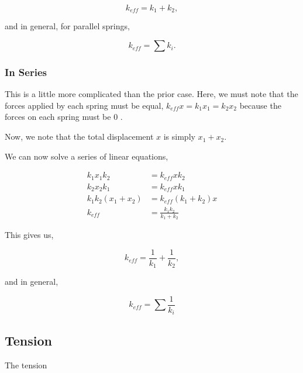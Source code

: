 \begin{equation*}
    \boxed{k_{eff} = k_1 + k_2},
\end{equation*}

and in general, for parallel springs, 

\begin{equation}
    \boxed{k_{eff} = \sum k_i.}
\end{equation}

\subsubsection{In Series}

This is a little more complicated than the prior case. Here, 
we must note that the forces applied by each spring must be equal, 
\(k_{eff}x = k_1x_1 = k_2x_2\) because 
the forces on each spring must be \(0\) .

Now, we note that the total displacement \(x\) is simply \(x_1 + x_2\). 

We can now solve a series of linear equations,

\begin{align*}
    k_1x_1k_2 &= k_{eff} xk_2 \\
    k_2x_2k_1 &= k_{eff} xk_1 \\
    k_1k_2(x_1 + x_2) &= k_{eff}(k_1 + k_2) x\\
    k_{eff} &= \frac{k_1k_2}{k_1 + k_2}
\end{align*}

This gives us, 

\begin{equation*}
    k_{eff} = \frac{1}{k_1} + \frac{1}{k_2},
\end{equation*}

and in general,

\begin{equation}
    \boxed{k_{eff} = \sum \frac{1}{k_i}}
\end{equation}

\subsection{Tension}

The tension 
